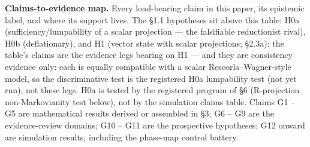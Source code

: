\documentclass[
]{article}
\begin{document}
\textbf{Claims-to-evidence map.} Every load-bearing claim in this paper,
its epistemic label, and where its support lives. The §1.1 hypotheses
sit above this table: H0a (sufficiency/lumpability of a scalar
projection --- the falsifiable reductionist rival), H0b (deflationary),
and H1 (vector state with scalar projections; §2.3a); the table's claims
are the evidence legs bearing on H1 --- and they are consistency
evidence only: each is equally compatible with a scalar
Rescorla--Wagner-style model, so the discriminative test is the
registered H0a lumpability test (not yet run), not these legs. H0a is
tested by the registered program of §6 (R-projection non-Markovianity
test below), not by the simulation claims table. Claims G1 -- G5 are
mathematical results derived or assembled in §3; G6 -- G9 are the
evidence-review domains; G10 -- G11 are the prospective hypotheses; G12
onward are simulation results, including the phase-map control battery.
\end{document}
